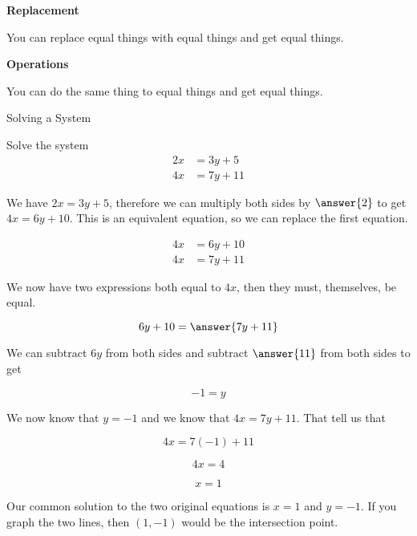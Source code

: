 \documentclass{ximera}
\begin{document}
\begin{fact} \textbf{\textcolor{purple!85!blue}{Replacement}} 

You can replace equal things with equal things and get equal things.

\end{fact}


\begin{fact} \textbf{\textcolor{purple!85!blue}{Operations}} 

You can do the same thing to equal things and get equal things.

\end{fact}






\begin{example} Solving a System


Solve the system
\begin{align*}
2x & = 3y + 5 \\
4x & = 7y + 11
\end{align*}



\begin{explanation}

We have $2x = 3y + 5$, therefore we can multiply both sides by $\answer{2}$ to get $4x = 6y + 10$.  This is an equivalent equation, so we can replace the first equation.

\begin{align*}
4x & = 6y + 10 \\
4x & = 7y + 11
\end{align*}


We now have two expressions both equal to $4x$, then they must, themselves, be equal.


\[   6y + 10 =  \answer{7y + 11}   \]

We can subtract $6y$ from both sides and subtract $\answer{11}$ from both sides to get


\[   -1 =  y   \]



We now know that $y=-1$ and we know that $4x = 7y + 11$.  That tell us that 


\[   4x = 7(-1) + 11   \]

\[   4x = 4   \]


\[ x = 1 \]


Our common solution to the two original equations is $x = 1$ and $y = -1$.  If you graph the two lines, then $(1, -1)$ would be the intersection point.

\end{explanation}
\end{example}
\end{document}
